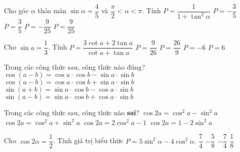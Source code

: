 \begin{ex}%
	Cho góc $\alpha$ thỏa mãn $\sin \alpha=\dfrac{4}{5}$ và $\dfrac{\pi}{2}<\alpha<\pi$. Tính $P=\dfrac{1}{1+\tan^2\alpha}$
	\choice
	{$P=-\dfrac{3}{5}$}
	{$P=\dfrac{3}{5}$}
	{$P=-\dfrac{9}{25}$}
	{\True $P=\dfrac{9}{25}$}
\end{ex}
\begin{ex}%
Cho $\sin a=\dfrac{1}{3}$. Tính $P=\dfrac{3 \cot a+2 \tan a}{\cot a+\tan a}$
\choice
{$P=\dfrac{9}{26}$}
{\True $P=\dfrac{26}{9}$}
{$P=-6$}
{$P=6$}
\end{ex}
\begin{ex}%
Trong các công thức sau, công thức nào đúng?
\choice
{$\cos (a-b)=\cos a \cdot \cos b-\sin a \cdot \sin b$}
{\True $\cos (a-b)=\cos a \cdot \cos b+\sin a \cdot \sin b$}
{$\sin (a+b)=\sin a \cdot \cos b-\cos a \cdot \sin b$}
{$\sin (a-b)=\sin a \cdot \cos b+\cos a \cdot \sin b$}
\loigiai{
}
\end{ex}
\begin{ex}%
Trong các công thức sau, công thức nào \textbf{sai}?
\choice
{$\cos 2 a=\cos ^2 a-\sin ^2 a$}
{\True $\cos 2 a=\cos ^2 a+\sin ^2 a$}
{$\cos 2 a=2 \cos ^2 a-1$}
{$\cos 2 a=1-2 \sin ^2 a$}
\loigiai{

}
\end{ex}
\begin{ex}%
Cho $\cos 2 \alpha=\dfrac{1}{2}$. Tính giá trị biểu thức $P=5 \sin ^2 \alpha-4 \cos ^2 \alpha$.
\choice
{$\dfrac{7}{4}$}
{$-\dfrac{5}{8}$}
{\True $-\dfrac{7}{4}$}
{$\dfrac{1}{8}$}
\end{ex}

